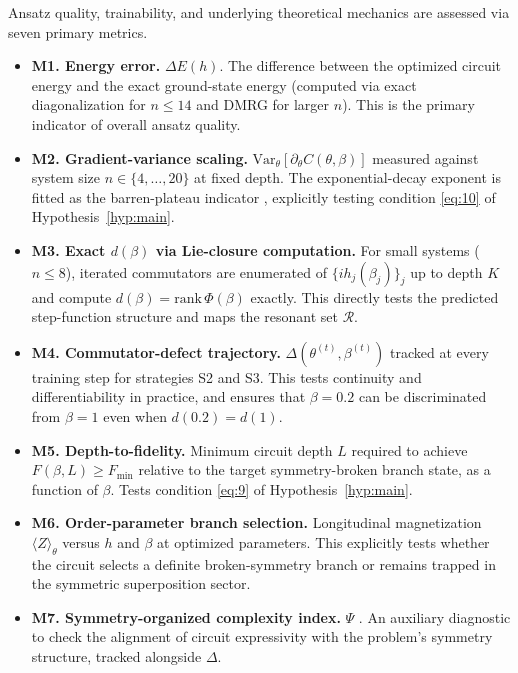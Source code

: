 \documentclass[10pt,twocolumn]{article}
\theoremstyle{remark}
\begin{document}
Ansatz quality, trainability, and underlying theoretical mechanics are assessed via seven primary metrics.
\begin{itemize}
    \item \textbf{M1. Energy error.} $\Delta E(h)$. The difference between the optimized circuit energy and the exact ground-state energy (computed via exact diagonalization for $n \le 14$ and DMRG for larger $n$). This is the primary indicator of overall ansatz quality.
    \item \textbf{M2. Gradient-variance scaling.} $\text{Var}_\theta[\partial_\theta C(\theta, \beta)]$ measured against system size $n \in \{4,\ldots,20\}$ at fixed depth. The exponential-decay exponent is fitted as the barren-plateau indicator \cite{holmes2022connecting,lan2026dla}, explicitly testing condition \eqref{eq:10} of Hypothesis~\ref{hyp:main}.
    \item \textbf{M3. Exact $d(\beta)$ via Lie-closure computation.} For small systems ($n \le 8$), iterated commutators are enumerated of $\{i h_j(\beta_j)\}_j$ up to depth $K$ and compute $d(\beta) = \text{rank}\, \Phi(\beta)$ exactly. This directly tests the predicted step-function structure and maps the resonant set $\mathcal{R}$.
    \item \textbf{M4. Commutator-defect trajectory.} $\Delta(\theta^{(t)}, \beta^{(t)})$ tracked at every training step for strategies S2 and S3. This tests continuity and differentiability in practice, and ensures that $\beta=0.2$ can be discriminated from $\beta=1$ even when $d(0.2)=d(1)$.
    \item \textbf{M5. Depth-to-fidelity.} Minimum circuit depth $L$ required to achieve $F(\beta, L) \ge F_{\text{min}}$ relative to the target symmetry-broken branch state, as a function of $\beta$. Tests condition \eqref{eq:9} of Hypothesis~\ref{hyp:main}.
    \item \textbf{M6. Order-parameter branch selection.} Longitudinal magnetization $\langle Z \rangle_\theta$ versus $h$ and $\beta$ at optimized parameters. This explicitly tests whether the circuit selects a definite broken-symmetry branch or remains trapped in the symmetric superposition sector.
    \item \textbf{M7. Symmetry-organized complexity index.} $\Psi$ \cite{meyer2023exploiting,schatzki2022theoretical}. An auxiliary diagnostic to check the alignment of circuit expressivity with the problem's symmetry structure, tracked alongside $\Delta$.
\end{itemize}
\end{document}

